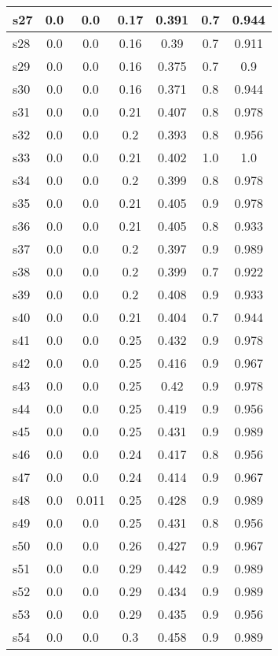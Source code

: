 \documentclass{article}
\begin{document}
\begin{tabular}{|l|c|c|c|c|c|c|}
\hline
s27 &0.0 & 0.0 & 0.17 & 0.391 & 0.7 & 0.944\\
\hline
s28 &0.0 & 0.0 & 0.16 & 0.39 & 0.7 & 0.911\\
\hline
s29 &0.0 & 0.0 & 0.16 & 0.375 & 0.7 & 0.9\\
\hline
s30 &0.0 & 0.0 & 0.16 & 0.371 & 0.8 & 0.944\\
\hline
s31 &0.0 & 0.0 & 0.21 & 0.407 & 0.8 & 0.978\\
\hline
s32 &0.0 & 0.0 & 0.2 & 0.393 & 0.8 & 0.956\\
\hline
s33 &0.0 & 0.0 & 0.21 & 0.402 & 1.0 & 1.0\\
\hline
s34 &0.0 & 0.0 & 0.2 & 0.399 & 0.8 & 0.978\\
\hline
s35 &0.0 & 0.0 & 0.21 & 0.405 & 0.9 & 0.978\\
\hline
s36 &0.0 & 0.0 & 0.21 & 0.405 & 0.8 & 0.933\\
\hline
s37 &0.0 & 0.0 & 0.2 & 0.397 & 0.9 & 0.989\\
\hline
s38 &0.0 & 0.0 & 0.2 & 0.399 & 0.7 & 0.922\\
\hline
s39 &0.0 & 0.0 & 0.2 & 0.408 & 0.9 & 0.933\\
\hline
s40 &0.0 & 0.0 & 0.21 & 0.404 & 0.7 & 0.944\\
\hline
s41 &0.0 & 0.0 & 0.25 & 0.432 & 0.9 & 0.978\\
\hline
s42 &0.0 & 0.0 & 0.25 & 0.416 & 0.9 & 0.967\\
\hline
s43 &0.0 & 0.0 & 0.25 & 0.42 & 0.9 & 0.978\\
\hline
s44 &0.0 & 0.0 & 0.25 & 0.419 & 0.9 & 0.956\\
\hline
s45 &0.0 & 0.0 & 0.25 & 0.431 & 0.9 & 0.989\\
\hline
s46 &0.0 & 0.0 & 0.24 & 0.417 & 0.8 & 0.956\\
\hline
s47 &0.0 & 0.0 & 0.24 & 0.414 & 0.9 & 0.967\\
\hline
s48 &0.0 & 0.011 & 0.25 & 0.428 & 0.9 & 0.989\\
\hline
s49 &0.0 & 0.0 & 0.25 & 0.431 & 0.8 & 0.956\\
\hline
s50 &0.0 & 0.0 & 0.26 & 0.427 & 0.9 & 0.967\\
\hline
s51 &0.0 & 0.0 & 0.29 & 0.442 & 0.9 & 0.989\\
\hline
s52 &0.0 & 0.0 & 0.29 & 0.434 & 0.9 & 0.989\\
\hline
s53 &0.0 & 0.0 & 0.29 & 0.435 & 0.9 & 0.956\\
\hline
s54 &0.0 & 0.0 & 0.3 & 0.458 & 0.9 & 0.989\\
\hline

\end{tabular}
\end{document}
